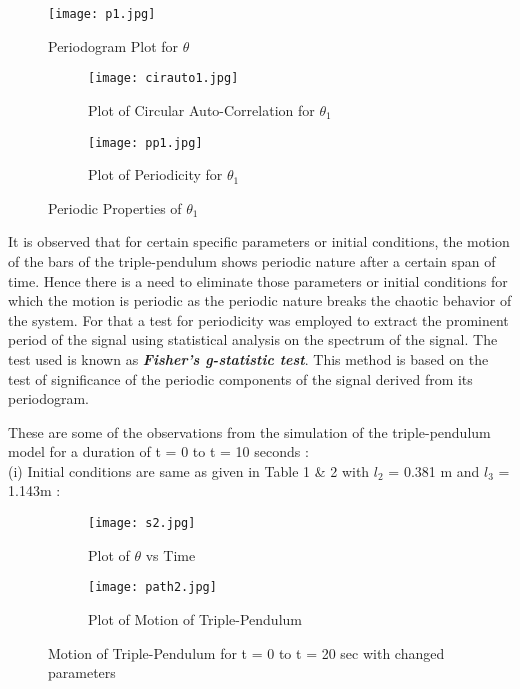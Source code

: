 \begin{figure}[H]
\centering
\texttt{[image: p1.jpg]}
\caption{Periodogram Plot for ${\theta}$ }\label{fig:p1}
\end{figure}

\begin{figure}[H]
\begin{subfigure}{0.5\textwidth}
\texttt{[image: cirauto1.jpg]}
\caption{Plot of Circular Auto-Correlation for ${\theta_{1}}$}\label{fig:cirauto1}
\end{subfigure}
\begin{subfigure}{0.5\textwidth}
\texttt{[image: pp1.jpg]}
\caption{Plot of Periodicity for ${\theta_{1}}$}\label{fig:pp1}
\end{subfigure}
\caption{Periodic Properties of ${\theta_{1}}$}\label{fig:image3}
\end{figure}



It is observed that for certain specific parameters or initial conditions, the motion of the bars of the triple-pendulum shows periodic nature after a certain span of time. Hence there is a need to eliminate those parameters or initial conditions for which the motion is periodic as the periodic nature breaks the chaotic behavior of the system. For that a test for periodicity was employed to extract the prominent period of the signal using statistical analysis on the spectrum of the signal. The test used is known as {\bf{\em Fisher's g-statistic test}}. This method is based on the test of significance of the periodic components of the signal derived from its periodogram. 

These are some of the observations from the simulation of the triple-pendulum model for a duration of t = 0 to t = 10 seconds :\\
(i) Initial conditions are same as given in Table 1 \& 2 with ${l_{2}}$ = 0.381 m and ${l_{3}}$ = 1.143m :\\

\begin{figure}[H]
\begin{subfigure}{0.5\textwidth}
\texttt{[image: s2.jpg]}
\caption{Plot of ${\theta}$ vs Time}\label{fig:s2}
\end{subfigure}
\begin{subfigure}{0.5\textwidth}
\texttt{[image: path2.jpg]}
\caption{Plot of Motion of Triple-Pendulum}\label{fig:path2}
\end{subfigure}
\caption{Motion of Triple-Pendulum for t = 0 to t = 20 sec with changed parameters}\label{fig:image4}
\end{figure}

